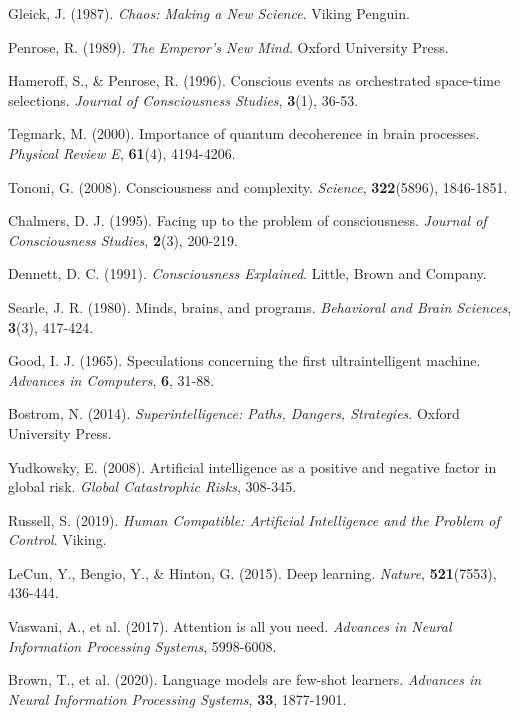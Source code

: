 \documentclass[12pt,a4paper]{article}
\begin{document}
\begin{thebibliography}{99}
Gleick, J. (1987). \textit{Chaos: Making a New Science}. Viking Penguin.

Penrose, R. (1989). \textit{The Emperor's New Mind}. Oxford University Press.

Hameroff, S., \& Penrose, R. (1996). Conscious events as orchestrated space-time selections. \textit{Journal of Consciousness Studies}, \textbf{3}(1), 36-53.

Tegmark, M. (2000). Importance of quantum decoherence in brain processes. \textit{Physical Review E}, \textbf{61}(4), 4194-4206.

Tononi, G. (2008). Consciousness and complexity. \textit{Science}, \textbf{322}(5896), 1846-1851.

Chalmers, D. J. (1995). Facing up to the problem of consciousness. \textit{Journal of Consciousness Studies}, \textbf{2}(3), 200-219.

Dennett, D. C. (1991). \textit{Consciousness Explained}. Little, Brown and Company.

Searle, J. R. (1980). Minds, brains, and programs. \textit{Behavioral and Brain Sciences}, \textbf{3}(3), 417-424.

Good, I. J. (1965). Speculations concerning the first ultraintelligent machine. \textit{Advances in Computers}, \textbf{6}, 31-88.

Bostrom, N. (2014). \textit{Superintelligence: Paths, Dangers, Strategies}. Oxford University Press.

Yudkowsky, E. (2008). Artificial intelligence as a positive and negative factor in global risk. \textit{Global Catastrophic Risks}, 308-345.

Russell, S. (2019). \textit{Human Compatible: Artificial Intelligence and the Problem of Control}. Viking.

LeCun, Y., Bengio, Y., \& Hinton, G. (2015). Deep learning. \textit{Nature}, \textbf{521}(7553), 436-444.

Vaswani, A., et al. (2017). Attention is all you need. \textit{Advances in Neural Information Processing Systems}, 5998-6008.

Brown, T., et al. (2020). Language models are few-shot learners. \textit{Advances in Neural Information Processing Systems}, \textbf{33}, 1877-1901.


\end{thebibliography}
\end{document}
